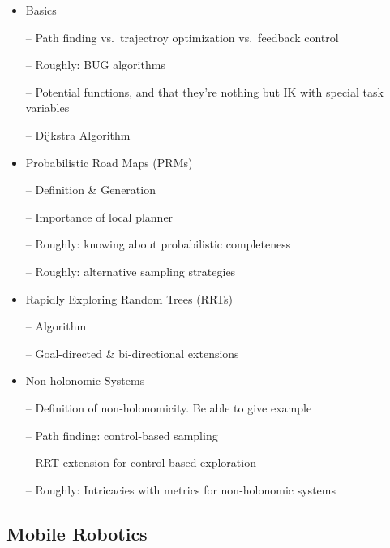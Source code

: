 \begin{itemize}

\item Basics

-- Path finding vs.\ trajectroy optimization vs.\ feedback control

-- Roughly: BUG algorithms

-- Potential functions, and that they're nothing but IK with special
task variables

-- Dijkstra Algorithm

\item Probabilistic Road Maps (PRMs)

-- Definition \& Generation

-- Importance of local planner

-- Roughly: knowing about probabilistic completeness

-- Roughly: alternative sampling strategies

\item Rapidly Exploring Random Trees (RRTs)

-- Algorithm

-- Goal-directed \& bi-directional extensions

\item Non-holonomic Systems

-- Definition of non-holonomicity. Be able to give example

-- Path finding: control-based sampling

-- RRT extension for control-based exploration

-- Roughly: Intricacies with metrics for non-holonomic systems

\end{itemize}


\subsection{Mobile Robotics}

